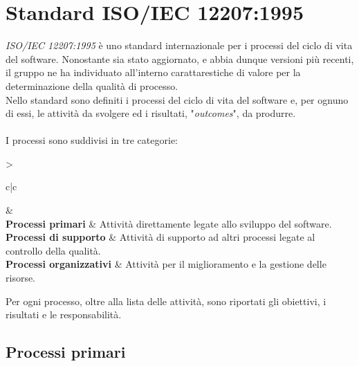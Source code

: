 \section{Standard ISO/IEC 12207:1995}
\textit{ISO/IEC 12207:1995} è uno standard 
internazionale per i processi del ciclo di vita del software.
Nonostante sia stato aggiornato, e abbia dunque versioni più recenti, il gruppo
ne ha individuato all'interno carattarestiche di valore per la determinazione
della qualità di processo.\\
\noindent
Nello standard sono definiti i processi del ciclo di vita del 
software e, per ognuno di essi, le attività da svolgere ed i
risultati, "\textit{outcomes}", da produrre.\\ \\
\noindent 
I processi sono suddivisi in tre categorie:

\setlength\extrarowheight{5pt}

\begin{table}[h!]
	\footnotesize
    \centering
    \begin{tabular}{>{\raggedright\arraybackslash}c|c}
        &  \\[4pt]
	    	\textbf{Processi primari} & Attività direttamente legate allo sviluppo del software. \\[4pt]
	    	\textbf{Processi di supporto} & Attività di supporto ad altri processi legate al controllo della qualità. \\[4pt]
	    	\textbf{Processi organizzativi} & Attività per il miglioramento e la gestione delle risorse.\\[4pt]
    \end{tabular}
    \caption{Categorie di processo}
\end{table}

\noindent
Per ogni processo, oltre alla lista delle attività, sono riportati
gli obiettivi, i risultati e le responsabilità.\\


\subsection{Processi primari}

